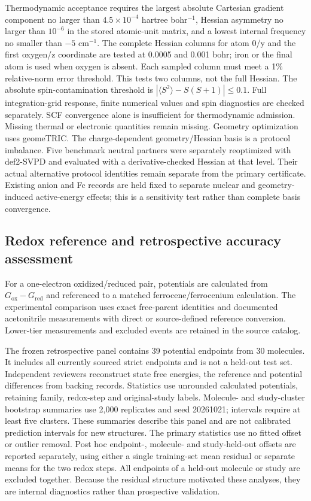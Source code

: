 \documentclass[11pt]{article}
\begin{document}
Thermodynamic acceptance requires the largest absolute Cartesian gradient component no larger than $4.5\times10^{-4}$ hartree bohr$^{-1}$, Hessian asymmetry no larger than $10^{-6}$ in the stored atomic-unit matrix, and a lowest internal frequency no smaller than $-5$ cm$^{-1}$. The complete Hessian columns for atom 0/y and the first oxygen/z coordinate are tested at 0.0005 and 0.001 bohr; iron or the final atom is used when oxygen is absent. Each sampled column must meet a 1\% relative-norm error threshold. This tests two columns, not the full Hessian. The absolute spin-contamination threshold is $|\langle S^2\rangle-S(S+1)|\leq0.1$. Full integration-grid response, finite numerical values and spin diagnostics are checked separately. SCF convergence alone is insufficient for thermodynamic admission. Missing thermal or electronic quantities remain missing. Geometry optimization uses geomeTRIC.\cite{geometric2016} The charge-dependent geometry/Hessian basis is a protocol imbalance. Five benchmark neutral partners were separately reoptimized with def2-SVPD and evaluated with a derivative-checked Hessian at that level. Their actual alternative protocol identities remain separate from the primary certificate. Existing anion and Fc records are held fixed to separate nuclear and geometry-induced active-energy effects; this is a sensitivity test rather than complete basis convergence.

\subsection{Redox reference and retrospective accuracy assessment}
For a one-electron oxidized/reduced pair, potentials are calculated from $G_{\mathrm{ox}}-G_{\mathrm{red}}$ and referenced to a matched ferrocene/ferrocenium calculation. The experimental comparison uses exact free-parent identities and documented acetonitrile measurements with direct or source-defined reference conversion. Lower-tier measurements and excluded events are retained in the source catalog.

The frozen retrospective panel contains 39 potential endpoints from 30 molecules. It includes all currently sourced strict endpoints and is not a held-out test set. Independent reviewers reconstruct state free energies, the reference and potential differences from backing records. Statistics use unrounded calculated potentials, retaining family, redox-step and original-study labels. Molecule- and study-cluster bootstrap summaries use 2,000 replicates and seed 20261021; intervals require at least five clusters. These summaries describe this panel and are not calibrated prediction intervals for new structures. The primary statistics use no fitted offset or outlier removal. Post hoc endpoint-, molecule- and study-held-out offsets are reported separately, using either a single training-set mean residual or separate means for the two redox steps. All endpoints of a held-out molecule or study are excluded together. Because the residual structure motivated these analyses, they are internal diagnostics rather than prospective validation.
\end{document}
